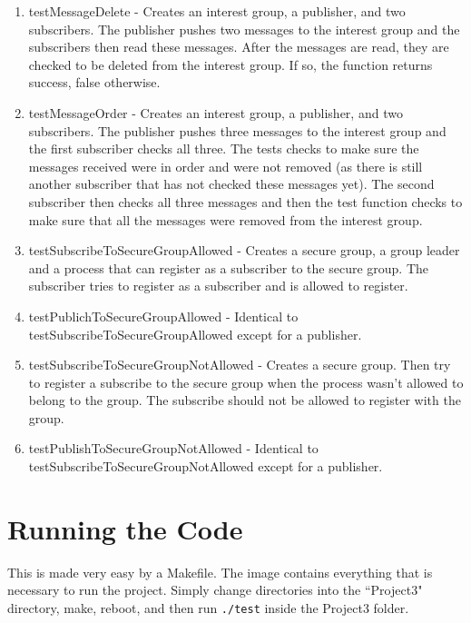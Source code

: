 \documentclass{article}
\begin{document}
\begin{enumerate}
	\item testMessageDelete - Creates an interest group, a publisher, and two subscribers.  The publisher pushes two messages to the interest group and the subscribers then read these messages.  After the messages are read, they are checked to be deleted from the interest group.  If so, the function returns success, false otherwise.
	\item testMessageOrder - Creates an interest group, a publisher, and two subscribers.  The publisher pushes three messages to the interest group and the first subscriber checks all three.  The tests checks to make sure the messages received were in order and were not removed (as there is still another subscriber that has not checked these messages yet). The second subscriber then checks all three messages and then the test function checks to make sure that all the messages were removed from the interest group.
	\item testSubscribeToSecureGroupAllowed - Creates a secure group, a group leader and a process that can register as a subscriber to the secure group. The subscriber tries to register as a subscriber and is allowed to register.
	\item testPublichToSecureGroupAllowed - Identical to testSubscribeToSecureGroupAllowed except for a publisher.
	\item testSubscribeToSecureGroupNotAllowed - Creates a secure group. Then try to register a subscribe to the secure group when the process wasn't allowed to belong to the group. The subscribe should not be allowed to register with the group. 
	\item testPublishToSecureGroupNotAllowed - Identical to testSubscribeToSecureGroupNotAllowed except for a publisher.


\end{enumerate}

\section{Running the Code}

This is made very easy by a Makefile.  The image contains everything that is necessary to run the project.  Simply change directories into the ``Project3" directory, make, reboot, and then run \verb+./test+ inside the Project3 folder.
\end{document}
